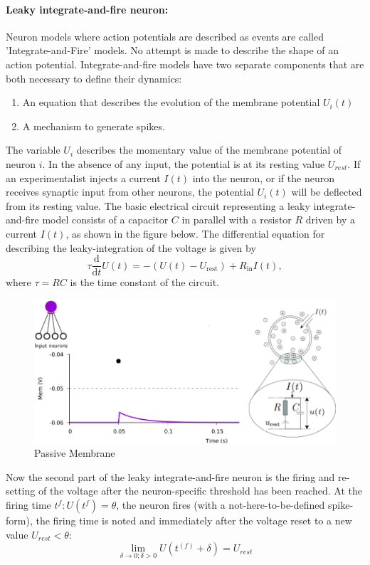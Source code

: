 \documentclass[main]{subfiles}
\begin{document}
\paragraph{Leaky integrate-and-fire neuron: }
Neuron models where action potentials are described as events are called 'Integrate-and-Fire' models. No attempt is made to describe the shape of an action potential. Integrate-and-fire models have two separate components that are both necessary to define their dynamics:
\begin{enumerate}
    \item An equation that describes the evolution of the membrane potential $U_i(t)$
    \item A mechanism to generate spikes.
\end{enumerate}
The variable $U_i$ describes the momentary value of the membrane potential of neuron $i$. In the absence of any input, the potential is at its resting value $U_{rest}$. If an experimentalist injects a current $I(t)$ into the neuron, or if the neuron receives synaptic input from other neurons, the potential $U_i(t)$ will be deflected from its resting value. The basic electrical circuit representing a leaky integrate-and-fire model consists of a capacitor $C$ in parallel with a resistor $R$ driven by a current $I(t)$, as shown in the figure below. The differential equation for describing the leaky-integration of the voltage is given by
%
\begin{equation}
\tau \frac{\mathrm{d}}{\mathrm{d} t} U(t)=-\left(U(t)-U_{\mathrm{rest}}\right)+R_{\mathrm{in}} I(t),
\end{equation}
where $\tau = RC$ is the time constant of the circuit. 
%
\begin{figure}[H]
    \centering
    \includegraphics[width=0.8\linewidth]{10_DeepLearningWithSpikes/figures/passive_membrane.png}
    \caption{Passive Membrane}
    \label{fig:my_label}
\end{figure}
%
Now the second part of the leaky integrate-and-fire neuron is the firing and re-setting of the voltage after the neuron-specific threshold has been reached. At the firing time $t^{f}: U(t^{f}) = \theta$, the neuron fires (with a not-here-to-be-defined spike-form), the firing time is noted and immediately after the voltage reset to a new value $U_{rest} < \theta$:
\begin{equation}
    \lim_{\delta \to 0; \delta > 0} U(t^{(f)} + \delta) = U_{rest}
\end{equation}
%
\end{document}
